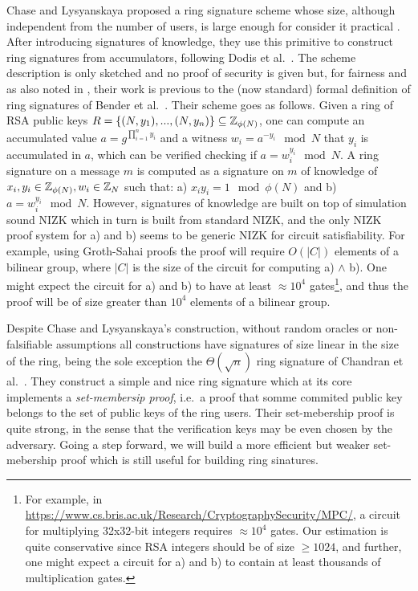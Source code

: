 Chase and Lysyanskaya proposed a ring signature scheme whose size, although independent from the number of users, is large enough for consider it practical \cite{C:ChaLys06}.%
After introducing
signatures of knowledge, they use this primitive to construct ring signatures from accumulators, following Dodis et al.~\cite{EC:DKNS04}. The scheme description is only sketched and no proof of security is given but, for fairness and as also noted in \cite{AC:MalSch17}, their work is previous to the (now standard) formal definition of ring signatures of Bender et al.~\cite{TCC:BenKatMor06}. Their scheme goes as follows.
Given a ring of RSA public keys $R = \{(N,y_1),...,(N,y_n)\}\subseteq \mathbb{Z}_{\phi(N)}$, one can compute an accumulated value $a = g^{\prod_{i=1}^n y_i}$ and a witness $w_i = a^{-y_i} \mod N$ that $y_i$ is accumulated in $a$, which can be verified checking if $a = w_i^{y_i} \mod N$. A ring signature on a message $m$ is computed as a signature on $m$ of knowledge of $x_i,y_i\in \mathbb{Z}_{\phi(N)}, w_i\in \mathbb{Z}_N$ such that: a) $x_iy_i = 1 \mod \phi(N)$ and b)  $a = w_i^{y_i} \mod N$. However, signatures of knowledge are built on top of simulation sound NIZK which in turn is built from standard NIZK, and the only NIZK proof system for a) and b) seems to be generic NIZK for circuit satisfiability. For example, using Groth-Sahai proofs the proof will require $O(|C|)$ elements of a bilinear group, where $|C|$ is the size of the circuit for computing a) $\wedge$ b). One might expect the circuit for a) and b) to have at least $\approx 10^4$ gates\footnote{For example, in \url{https://www.cs.bris.ac.uk/Research/CryptographySecurity/MPC/}, a circuit for multiplying 32x32-bit integers requires $\approx 10^4$ gates. Our estimation is quite conservative since RSA integers should be of size $\geq 1024$, and further, one might expect a circuit for a) and b) to contain at least thousands of multiplication gates.}, and thus the proof will be of size greater than $10^4$ elements of a bilinear group.

Despite Chase and Lysyanskaya's construction, without random oracles or non-falsifiable assumptions all constructions have signatures of size linear in the size of the ring, being the sole exception the $\Theta(\sqrt{n})$ ring signature of Chandran et al.~\cite{ICALP:ChaGroSah07}. They construct a simple and nice ring signature which at its core implements a \emph{set-membersip proof}, i.e.~a proof that somme commited public key belongs to the set of public keys of the ring users. Their set-mebership proof is quite strong, in the sense that the verification keys may be even chosen by the adversary. Going a step forward, we will build a more efficient but weaker set-mebership proof which is still useful for building ring sinatures.

